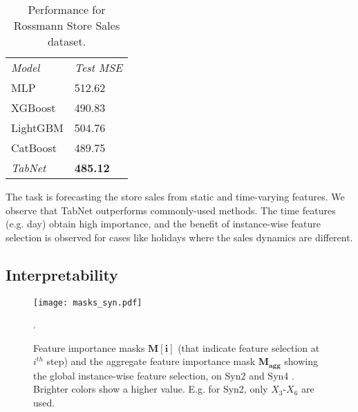 \begin{table}[h!]
\vspace{0cm}
\caption{Performance for Rossmann Store Sales dataset.}
\centering
\begin{tabular}{|C{3 cm}|C{2.7 cm}|}
    \textit{Model} & \textit{Test MSE}        \\ 
    MLP & 512.62              \\ 
    XGBoost & 490.83                 \\ 
    LightGBM  & 504.76                \\ 
    CatBoost & 489.75               \\ \hhline{|=|=|}
    \textit{TabNet}  &  \textbf{485.12}  \\ 
\end{tabular}
\label{table:rossmann}
\vspace{0cm}
\end{table}
\vspace{0cm}

\noindent{} The task is forecasting the store sales from static and time-varying features. We observe that TabNet outperforms commonly-used methods. 
The time features (e.g. day) obtain high importance, and the benefit of instance-wise feature selection is observed for cases like holidays where the sales dynamics are different.

\vspace{0cm}
\subsection{Interpretability}
\label{interpretability_section}
\vspace{0cm}

\begin{figure*}[!htbp]
\centering
\texttt{[image: masks\_syn.pdf]}

\caption{Feature importance masks $\mathbf{M[i]}$ (that indicate feature selection at $i^{th}$ step) and the aggregate feature importance mask $\mathbf{M_{agg}}$ showing the global instance-wise feature selection, on Syn2 and Syn4 \citep{l2x}. Brighter colors show a higher value. E.g. for Syn2, only $X_3$-$X_6$ are used.}.

\label{fig:syn_masks}
\end{figure*}


